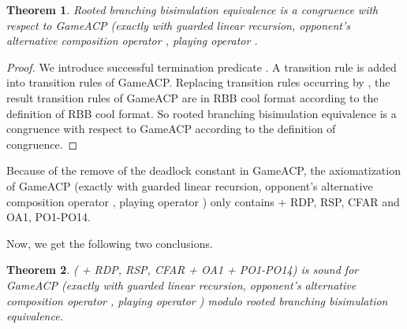 \documentclass{fac}
\newtheorem{theorem}{Theorem}[section]
\begin{document}
\begin{theorem}
Rooted branching bisimulation equivalence is a congruence with respect to GameACP (exactly  with guarded linear recursion, opponent's alternative composition operator , playing operator .
\end{theorem}

\begin{proof}
We introduce successful termination predicate . A transition rule  is added into transition rules of GameACP. Replacing transition rules occurring  by , the result transition rules of GameACP are in RBB cool format according to the definition of RBB cool format. So rooted branching bisimulation equivalence is a congruence with respect to GameACP according to the definition of congruence.
\end{proof}

Because of the remove of the deadlock constant in GameACP, the axiomatization  of GameACP (exactly  with guarded linear recursion, opponent's alternative composition operator , playing operator ) only contains  + RDP, RSP, CFAR and OA1, PO1-PO14.

Now, we get the following two conclusions.

\begin{theorem}
 ( + RDP, RSP, CFAR + OA1 + PO1-PO14) is sound for GameACP (exactly  with guarded linear recursion, opponent's alternative composition operator , playing operator ) modulo rooted branching bisimulation equivalence.
\end{theorem}
\end{document}
